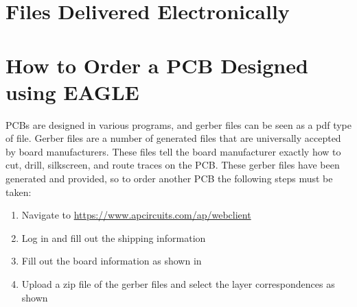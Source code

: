 \documentclass{report}
\begin{document}
	\appendix
	\chapter{Files Delivered Electronically}
		

	\chapter{How to Order a PCB Designed using EAGLE}
	PCBs are designed in various programs, and gerber files can be seen as a pdf type of file.  Gerber files are a number of generated files that are universally accepted by board manufacturers.  These files tell the board manufacturer exactly how to cut, drill, silkscreen, and route traces on the PCB. These gerber files have been generated and provided, so to order another PCB the following steps must be taken:
	
	\begin{enumerate}
		\item Navigate to \url{https://www.apcircuits.com/ap/webclient}
		\item Log in and fill out the shipping information
		\item Fill out the board information as shown in 
		\item Upload a zip file of the gerber files and select the layer correspondences as shown 
	\end{enumerate}
	
\end{document}
